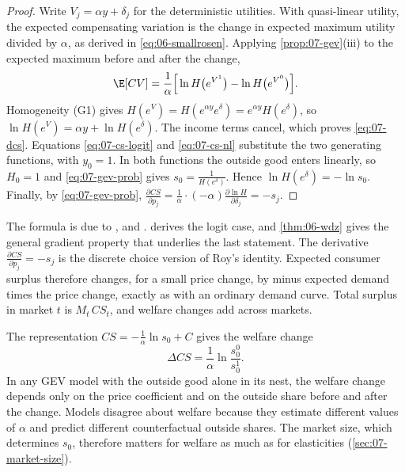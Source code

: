 \begin{proof}
Write $V_j = \alpha y + \delta_j$ for the deterministic utilities. With quasi-linear utility, the expected
compensating variation is the change in expected maximum utility divided by $\alpha$, as derived in
\eqref{eq:06-smallrosen}. Applying \cref{prop:07-gev}(iii) to the expected maximum before and after the change,
\begin{equation*}
\E[CV] = \frac{1}{\alpha}\Big[\ln H\big(e^{V^1}\big) - \ln H\big(e^{V^0}\big)\Big] .
\end{equation*}
Homogeneity (G1) gives $H(e^{V}) = H(e^{\alpha y}e^{\delta}) = e^{\alpha y}H(e^{\delta})$, so
$\ln H(e^V) = \alpha y + \ln H(e^{\delta})$. The income terms cancel, which proves \eqref{eq:07-dcs}. Equations
\eqref{eq:07-cs-logit} and \eqref{eq:07-cs-nl} substitute the two generating functions, with $y_0 = 1$.
In both functions the outside good enters linearly, so $H_0 = 1$ and \eqref{eq:07-gev-prob} gives
$s_0 = \frac{1}{H(e^{\delta})}$. Hence $\ln H(e^{\delta}) = -\ln s_0$. Finally, by \eqref{eq:07-gev-prob},
$\frac{\partial CS}{\partial p_j} = \frac{1}{\alpha}\cdot(-\alpha)\frac{\partial\ln H}{\partial\delta_j} = -s_j$.
\end{proof}

The formula is due to \citet{Williams1977}, \citet{SmallRosen1981} and \citet{McFadden1981}. 
derives the logit case, and \cref{thm:06-wdz} gives the general gradient property that underlies the last
statement. The derivative $\frac{\partial CS}{\partial p_j} = -s_j$ is the discrete choice version of Roy's identity.
Expected consumer surplus therefore changes, for a small price change, by minus expected demand times the price
change, exactly as with an ordinary demand curve. Total surplus in market $t$ is $M_t\,CS_t$, and welfare changes
add across markets.

The representation $CS = -\frac{1}{\alpha}\ln s_0 + C$ gives the welfare change
\begin{equation}\label{eq:07-dcs-s0}
\Delta CS = \frac{1}{\alpha}\ln\frac{s_0^0}{s_0^1} .
\end{equation}
In any GEV model with the outside good alone in its nest, the welfare change depends only on the price coefficient
and on the outside share before and after the change. Models disagree about welfare because they estimate different
values of $\alpha$ and predict different counterfactual outside shares. The market size, which determines $s_0$,
therefore matters for welfare as much as for elasticities (\cref{sec:07-market-size}).

